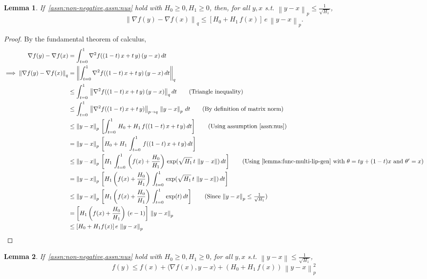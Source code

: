 \documentclass{article}
\newtheorem{lemma}{Lemma}
\newcommand{\normsq}[1]{\left\|#1 \right\|^{2}}
\newcommand{\norm}[1]{\left\|#1 \right\|}
\begin{document}
\begin{lemma}
If~\cref{assn:non-negative,assn:nus} hold with $H_0 \geq 0, H_1 \geq 0$, then, for all $y,x$ s.t. $\norm{y - x}_p \leq \frac{1}{\sqrt{H_1}}$, 
\[
\norm{\nabla f(y) - \nabla f(x)}_{q} \leq [H_0 + H_1 \, f(x)] \, e \, \norm{y - x}_p.
\]
\label{lemma:grad-lip-gen}
\end{lemma}
\begin{proof}
By the fundamental theorem of calculus, 
\begin{align*}
\nabla f(y) - \nabla f(x) & = \int_{t = 0}^{1} \nabla^2 f((1-t) \, x + t \, y) \, (y - x) \, dt \\
\implies \norm{\nabla f(y) - \nabla f(x)}_q & = \norm{\int_{t = 0}^{1} \nabla^2 f((1-t) \, x + t \, y) \, (y - x) \, dt}_q \\
& \leq \int_{t = 0}^{1} \, \norm{\nabla^2 f((1-t) \, x + t \, y) \, (y - x)}_{q} dt \tag{Triangle inequality} \\
& \leq \int_{t = 0}^{1} \, \norm{\nabla^2 f((1-t) \, x + t \, y)}_{p \to q} \, \norm{y - x}_p \, dt \tag{By definition of matrix norm} \\
& \leq \norm{y - x}_p \, \left[\int_{t = 0}^{1} \, H_0 + H_1 \, f((1-t) \, x + t \, y) \, dt \right] \tag{Using assumption \ref{assn:nus}}\\
& = \norm{y - x}_p \, \left[H_0 + H_1 \, \int_{t = 0}^{1} \, f((1-t) \, x + t \, y) \, dt \right] \\
& \leq \norm{y - x}_p \, \left[ H_1 \, \int_{t = 0}^{1} \, \left(f(x) + \frac{H_0}{H_1} \right)\, \exp(\sqrt{H_1} \, t \, \norm{y - x}) \, dt \right] \tag{Using~\cref{lemma:func-multi-lip-gen} with $\theta = ty + (1-t)x$ and $\theta' = x$} \\
& = \norm{y - x}_p \, \left[H_1 \left(f(x) + \frac{H_0}{H_1} \right) \, \int_{t = 0}^{1} \, \exp(\sqrt{H_1} \, t \, \norm{y - x}) \, dt \right]  \\
& \leq \norm{y - x}_p \, \left[H_1 \left(f(x) + \frac{H_0}{H_1} \right) \, \int_{t = 0}^{1} \, \exp(t) \, dt \right]  \tag{Since $\norm{y - x}_p \leq \frac{1}{\sqrt{H_1}}$} \\
& = \left[H_1 \left(f(x) + \frac{H_0}{H_1} \right) \, (e-1) \right]\, \norm{y - x}_p \\
& \leq [H_0 + H_1 f(x)] \,  e \, \norm{y - x}_p 
\end{align*}
\end{proof}
\begin{lemma}
If~\cref{assn:non-negative,assn:nus} hold with $H_0 \geq 0, H_1 \geq 0$, for all $y, x$ s.t. $\norm{y - x} \leq \frac{1}{\sqrt{H_1}}$, 
\[
f(y) \leq f(x) + \langle \nabla f(x), y - x \rangle + \left(H_0+ H_1 \, f(x) \right) \, \normsq{y - x}_p
\] 
\label{lemma:descent-ineq-gen}
\end{lemma}
\end{document}
